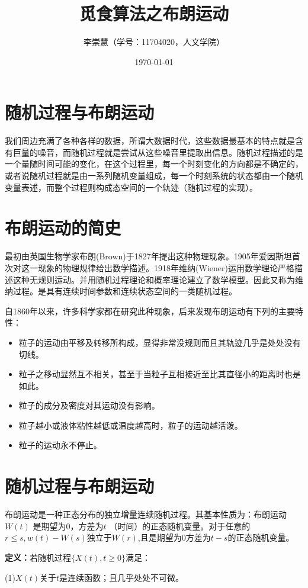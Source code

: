 \documentclass[UTF8]{ctexart}
\title{觅食算法之布朗运动}
\date{\today}
\author{李崇慧（学号：11704020，人文学院）}
\begin{document}
\maketitle


\section{随机过程与布朗运动}
我们周边充满了各种各样的数据，所谓大数据时代，这些数据最基本的特点就是含有巨量的噪音，而随机过程就是尝试从这些噪音里提取出信息。随机过程描述的是一个量随时间可能的变化，在这个过程里，每一个时刻变化的方向都是不确定的，或者说随机过程就是由一系列随机变量组成，每一个时刻系统的状态都由一个随机变量表述，而整个过程则构成态空间的一个轨迹（随机过程的实现）。


\section{布朗运动的简史}
最初由英国生物学家布朗(Brown)于1827年提出这种物理现象。1905年爱因斯坦首次对这一现象的物理规律给出数学描述。1918年维纳(Wiener)运用数学理论严格描述这种无规则运动。并用随机过程理论和概率理论建立了数学模型。因此又称为维纳过程。是具有连续时间参数和连续状态空间的一类随机过程。

自1860年以来，许多科学家都在研究此种现象，后来发现布朗运动有下列的主要特性：
\begin{itemize}
  \item 粒子的运动由平移及转移所构成，显得非常没规则而且其轨迹几乎是处处没有切线。
  \item 粒子之移动显然互不相关，甚至于当粒子互相接近至比其直径小的距离时也是如此。
  \item 粒子的成分及密度对其运动没有影响。
  \item 粒子越小或液体粘性越低或温度越高时，粒子的运动越活泼。
  \item 粒子的运动永不停止。
\end{itemize}

\section{随机过程与布朗运动}
布朗运动是一种正态分布的独立增量连续随机过程。其基本性质为：布朗运动$W(t)$ 是期望为0，方差为$t$ （时间）的正态随机变量。对于任意的$r\le s, w(t)-W(s)$独立于$W(r)$,且是期望为0方差为$t-s$的正态随机变量。

\textbf{定义：}若随机过程$\{X(t),t\ge0\}$满足：

(1)$X(t)$关于$t$是连续函数；且几乎处处不可微。
\end{document}
